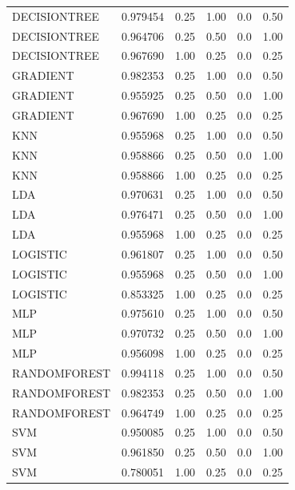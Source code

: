 \documentclass[letterpaper]{article}
\begin{document}
{\begin{tiny}
\begin{longtable}{lrrrrr}
\bottomrule
\endlastfoot
DECISIONTREE & 0.979454 &      0.25 & 1.00 &        0.0 &       0.50 \\
DECISIONTREE & 0.964706 &      0.25 & 0.50 &        0.0 &       1.00 \\
DECISIONTREE & 0.967690 &      1.00 & 0.25 &        0.0 &       0.25 \\
GRADIENT & 0.982353 &      0.25 & 1.00 &        0.0 &       0.50 \\
GRADIENT & 0.955925 &      0.25 & 0.50 &        0.0 &       1.00 \\
GRADIENT & 0.967690 &      1.00 & 0.25 &        0.0 &       0.25 \\
KNN & 0.955968 &      0.25 & 1.00 &        0.0 &       0.50 \\
KNN & 0.958866 &      0.25 & 0.50 &        0.0 &       1.00 \\
KNN & 0.958866 &      1.00 & 0.25 &        0.0 &       0.25 \\
LDA & 0.970631 &      0.25 & 1.00 &        0.0 &       0.50 \\
LDA & 0.976471 &      0.25 & 0.50 &        0.0 &       1.00 \\
LDA & 0.955968 &      1.00 & 0.25 &        0.0 &       0.25 \\
LOGISTIC & 0.961807 &      0.25 & 1.00 &        0.0 &       0.50 \\
LOGISTIC & 0.955968 &      0.25 & 0.50 &        0.0 &       1.00 \\
LOGISTIC & 0.853325 &      1.00 & 0.25 &        0.0 &       0.25 \\
MLP & 0.975610 &      0.25 & 1.00 &        0.0 &       0.50 \\
MLP & 0.970732 &      0.25 & 0.50 &        0.0 &       1.00 \\
MLP & 0.956098 &      1.00 & 0.25 &        0.0 &       0.25 \\
RANDOMFOREST & 0.994118 &      0.25 & 1.00 &        0.0 &       0.50 \\
RANDOMFOREST & 0.982353 &      0.25 & 0.50 &        0.0 &       1.00 \\
RANDOMFOREST & 0.964749 &      1.00 & 0.25 &        0.0 &       0.25 \\
SVM & 0.950085 &      0.25 & 1.00 &        0.0 &       0.50 \\
SVM & 0.961850 &      0.25 & 0.50 &        0.0 &       1.00 \\
SVM & 0.780051 &      1.00 & 0.25 &        0.0 &       0.25 \\
\end{longtable}
\end{tiny}

}
\end{document}
